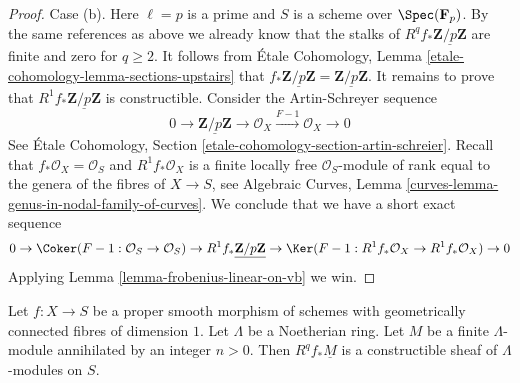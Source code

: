\begin{proof}
\medskip\noindent
Case (b). Here $\ell = p$ is a prime and $S$ is a scheme over
$\Spec(\mathbf{F}_p)$. By the same references as above we already
know that the stalks of $R^qf_*\underline{\mathbf{Z}/p\mathbf{Z}}$
are finite and zero for $q \geq 2$. It follows from
\'Etale Cohomology, Lemma \ref{etale-cohomology-lemma-sections-upstairs}
that $f_*\underline{\mathbf{Z}/p\mathbf{Z}} =
\underline{\mathbf{Z}/p\mathbf{Z}}$. It remains to prove
that $R^1f_*\underline{\mathbf{Z}/p\mathbf{Z}}$ is constructible.
Consider the Artin-Schreyer sequence
$$
0 \to \underline{\mathbf{Z}/p\mathbf{Z}} \to \mathcal{O}_X
\xrightarrow{F - 1} \mathcal{O}_X
\to 0
$$
See \'Etale Cohomology, Section \ref{etale-cohomology-section-artin-schreier}.
Recall that $f_*\mathcal{O}_X = \mathcal{O}_S$ and
$R^1f_*\mathcal{O}_X$ is a finite locally free $\mathcal{O}_S$-module
of rank equal to the genera of the fibres of $X \to S$, see
Algebraic Curves, Lemma \ref{curves-lemma-genus-in-nodal-family-of-curves}.
We conclude that we have a short exact sequence
$$
0 \to
\Coker(F - 1 : \mathcal{O}_S \to \mathcal{O}_S)
\to R^1f_*\underline{\mathbf{Z}/p\mathbf{Z}} \to
\Ker(F - 1 : R^1f_*\mathcal{O}_X \to R^1f_*\mathcal{O}_X)
\to 0
$$
Applying Lemma \ref{lemma-frobenius-linear-on-vb} we win.
\end{proof}

\begin{lemma}
\label{lemma-proper-smooth-family-curves-modules}
Let $f : X \to S$ be a proper smooth morphism of schemes with
geometrically connected fibres of dimension $1$. Let $\Lambda$
be a Noetherian ring. Let $M$ be a finite $\Lambda$-module
annihilated by an integer $n > 0$. Then $R^qf_*\underline{M}$
is a constructible sheaf of $\Lambda$-modules on $S$.
\end{lemma}

